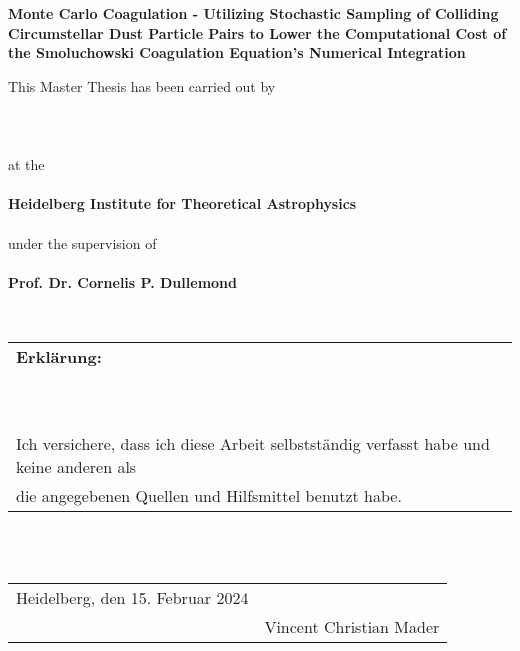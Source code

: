\begin{titlepage}
    \begin{center}
        \begin{Large}
            \textbf{
                Monte Carlo Coagulation - 
                Utilizing Stochastic Sampling of Colliding Circumstellar Dust Particle Pairs 
                to Lower
                the Computational Cost of the Smoluchowski Coagulation Equation's 
                Numerical Integration
            }
        \end{Large}
        
        \vfill
        
        This Master Thesis has been carried out by 
        \\ \ \\
        \textbf{\theauthor} 
        \\ \ \\
        at the 
        \\ \ \\
        \textbf{Heidelberg Institute for Theoretical Astrophysics}
        \\ \ \\
        under the supervision of 
        \\ \ \\
        \textbf{Prof. Dr. Cornelis P. Dullemond}
    \end{center}
\end{titlepage}

\begin{titlepage}
    \ 
\end{titlepage}

\def\dotsign{\xleaders\hbox to .2em{\d{}}\hfill\d{}}

\begin{titlepage}
    \begin{tabular}{l}
        \textbf{Erklärung:} \\
        \ \\
        \ \\
        Ich versichere, dass ich diese Arbeit selbstständig verfasst habe und keine anderen als \\ 
        die angegebenen Quellen und Hilfsmittel benutzt habe. \\
    \end{tabular}

        \ \\
        \ \\

    \begin{tabularx}{\textwidth}{l @{}p{10cm}@{}}
            Heidelberg, den 15. Februar 2024
        & 
            \hspace{10mm} \hrulefill 
        \\ 
        & 
            \hspace{10mm} Vincent Christian Mader 
    \end{tabularx}

\end{titlepage}
